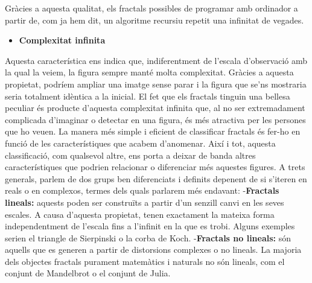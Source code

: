 \documentclass[12pt]{report}
\begin{document}
Gràcies a aquesta qualitat, els fractals possibles de programar amb ordinador a partir de, com ja hem dit, un algoritme recursiu repetit una infinitat de vegades.

\begin{itemize}
    \item \textbf{Complexitat infinita}
\end{itemize}
Aquesta característica ens indica que, indiferentment de l'escala d'observació amb la qual la veiem, la figura sempre manté molta complexitat.
\newline
Gràcies a aquesta propietat, podríem ampliar una imatge sense parar i la figura que se'ns mostraria seria totalment idèntica a la inicial.
\newline
El fet que els fractals tinguin una bellesa peculiar és producte d'aquesta complexitat infinita que, al no ser extremadament complicada d'imaginar o detectar en una figura, és més atractiva per les persones que ho veuen.
\newline
\newline
La manera més simple i eficient de classificar fractals és fer-ho en funció de les característiques que acabem d'anomenar. Així i tot, aquesta classificació, com qualsevol altre, ens porta a deixar de banda altres característiques que podrien relacionar o diferenciar més aquestes figures.
\newline
A trets generals, parlem de dos grups ben diferenciats i definits depenent de si s'iteren en reals o en complexos, termes dels quals parlarem més endavant:
\newline
\newline
-\textbf{Fractals lineals:} aquests poden ser construïts a partir d'un senzill canvi en les seves escales. A causa d'aquesta propietat, tenen exactament la mateixa forma independentment de l'escala fins a l'infinit en la que es trobi. Alguns exemples serien el triangle de Sierpinski o la corba de Koch.
\newline
\newline
-\textbf{Fractals no lineals:} són aquells que es generen a partir de distorsions complexes o no lineals. La
majoria dels objectes fractals purament matemàtics i naturals no són lineals, com el conjunt de
Mandelbrot o el conjunt de Julia.
\end{document}
